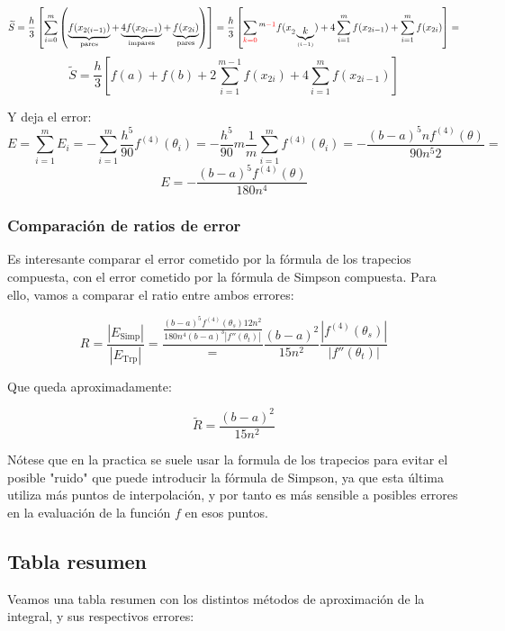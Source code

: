 \[
    \widetilde{S} = \frac{h}{3} \left[ 
    \sum_{i=0}^{m} \left( 
        \underbrace{f(x_{2(i-1)})}_{\text{pares}} +
        \underbrace{4f(x_{2i-1})}_{\text{impares}} +
        \underbrace{f(x_{2i})}_{\text{pares}}
        \right)
    \right] =
    \frac{h}{3} \left[
        \sum_{\color{red} k = 0}^{\color{black} m \color{red} - 1} f(x_{2\underbrace{k}_{(i-1)}}) +
        4\sum_{i=1}^{m} f(x_{2i-1}) +
        \sum_{i=1}^{m} f(x_{2i})
    \right] =
\]
\[
    \boxed{\widetilde{S} = \frac{h}{3} \left[
        f(a) + f(b)
        + 2\sum_{i=1}^{m-1} f(x_{2i})
        + 4\sum_{i=1}^{m} f(x_{2i-1})
    \right]}
\]

Y deja el error:
\[
    E = \sum_{i=1}^{m} E_i =
    - \sum_{i=1}^{m} \frac{h^5}{90} f^{(4)}(\theta_i) =
    -\frac{h^5}{90} m \frac{1}{m} \sum_{i=1}^{m} f^{(4)}(\theta_i) =
    - \frac{(b-a)^5 n f^{(4)}(\theta)}{90 n^5 2} =
\]
\[
    \boxed{
        E = -\frac{(b-a)^5 f^{(4)}(\theta)}{180 n^4}
    }
\]

\subsubsection{Comparación de ratios de error}

Es interesante comparar el error cometido por la fórmula de los trapecios compuesta, con el error cometido por la fórmula de Simpson compuesta. Para ello, vamos a comparar el ratio entre ambos errores:

\[
    R = \frac{|E_{\text{Simp}}|}{|E_{\text{Trp}}|} =
    \frac{\frac{(b-a)^5 f^{(4)}(\theta_s) 12 n^2}{180 n^4 (b-a)^3 |f''(\theta_t)|}} =
    \frac{(b-a)^2}{15 n^2} \frac{|f^{(4)}(\theta_s)|}{|f''(\theta_t)|}
\]

Que queda aproximadamente:

\[
    \widetilde{R} = \frac{(b-a)^2}{15 n^2}
\]

Nótese que en la practica se suele usar la formula de los trapecios para evitar el posible "ruido" que puede introducir la fórmula de Simpson, ya que esta última utiliza más puntos de interpolación, y por tanto es más sensible a posibles errores en la evaluación de la función $f$ en esos puntos.

\subsection{Tabla resumen}

Veamos una tabla resumen con los distintos métodos de aproximación de la integral, y sus respectivos errores:

